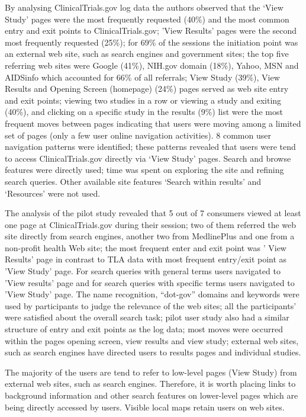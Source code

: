 \documentclass[]{article}
\begin{document}
By analysing ClinicalTrials.gov log data the authors observed that the ‘View Study' pages were the most frequently requested (40\%) and the most common entry and exit points to ClinicalTrials.gov; 'View Results' pages were the second most frequently requested (25\%); for 69\% of the sessions the initiation point was an external web site, such as search engines and government sites; the top five referring web sites were Google (41\%), NIH.gov domain (18\%), Yahoo, MSN and AIDSinfo which accounted for 66\% of all referrals; View Study (39\%), View Results and Opening Screen (homepage)  (24\%) pages served as web site entry and exit points; 
viewing two studies in a row or viewing a study and exiting (40\%), and clicking on a specific study in the results (9\%) list were the most frequent moves between pages indicating that users were moving among a limited set of pages (only a few user online navigation activities). 8 common user navigation patterns were identified; these patterns revealed that users were tend to access ClinicalTrials.gov directly via ‘View Study’ pages. Search and browse features were directly used; time was spent on exploring the site and refining search queries. Other available site features ‘Search within results’ and ‘Resources’ were not used.

The analysis of the pilot study revealed that 5 out of 7 consumers viewed at least one page at ClinicalTrials.gov during their session; two of them referred the web site directly from search engines, another two from MedlinePlus and one from a non-profit health Web site; the most frequent enter and exit point was ' View Results' page in contrast to TLA data with most frequent entry/exit point as 'View Study' page. For search queries with general terms users navigated to 'View results' page and for search queries with specific terms users navigated to 'View Study' page. The name recognition, “dot-gov” domains and keywords were used by participants to judge the relevance of the web sites; all the participants' were satisfied about the overall search task; pilot user study also had a similar structure of entry and exit points as the log data; most moves were occurred within the pages opening screen, view results and view study; external web sites, such as search engines have directed users to results pages and individual studies. 

The majority of the users are tend to refer to low-level pages (View Study) from external web sites, such as search engines. Therefore, it is worth placing links to background information and other search features on lower-level pages which are being directly accessed by users. Visible local maps retain users on web sites.
\end{document}
